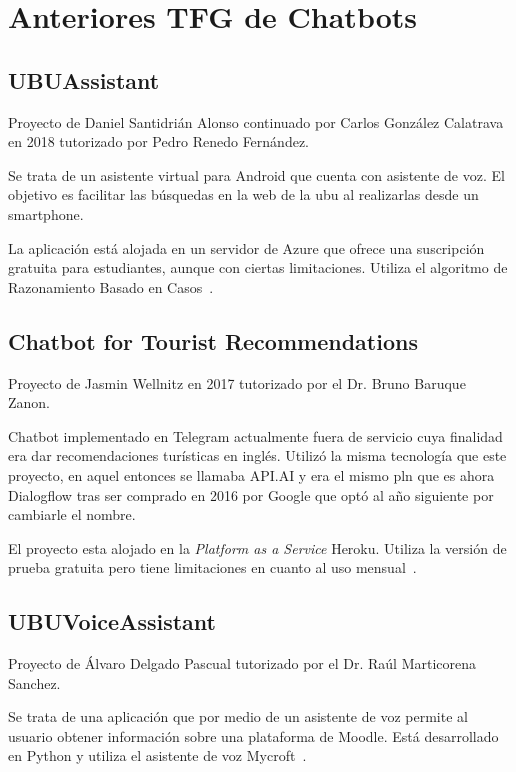 
\section{Anteriores TFG de Chatbots}

\subsection{UBUAssistant}

Proyecto de Daniel Santidrián Alonso continuado por Carlos González Calatrava en 2018 tutorizado por Pedro Renedo Fernández.

Se trata de un asistente virtual para Android que cuenta con asistente de voz. El objetivo es facilitar las búsquedas en la web de la \acrshort{ubu} al realizarlas desde un smartphone.

La aplicación está alojada en un servidor de Azure que ofrece una suscripción gratuita para estudiantes, aunque con ciertas limitaciones. Utiliza el algoritmo de Razonamiento Basado en Casos~\cite{UBUAssistant}. 

\subsection{Chatbot for Tourist Recommendations}

Proyecto de Jasmin Wellnitz en 2017 tutorizado por el Dr. Bruno Baruque Zanon. 

Chatbot implementado en Telegram actualmente fuera de servicio cuya finalidad era dar recomendaciones turísticas en inglés.
Utilizó la misma tecnología que este proyecto, en aquel entonces se llamaba API.AI y era el mismo \acrshort{pln} que es ahora Dialogflow tras ser comprado en 2016 por Google que optó al año siguiente por cambiarle el nombre.

El proyecto esta alojado en la \textit{Platform as a Service} Heroku. Utiliza la versión de prueba gratuita pero tiene limitaciones en cuanto al uso mensual~\cite{ChatbotTourist}. 

\subsection{UBUVoiceAssistant}

Proyecto de Álvaro Delgado Pascual tutorizado por el Dr. Raúl Marticorena Sanchez.

Se trata de una aplicación que por medio de un asistente de voz permite al usuario obtener información sobre una plataforma de Moodle. Está desarrollado en Python y utiliza el asistente de voz Mycroft~\cite{UBUVoiceAssistant}. 


